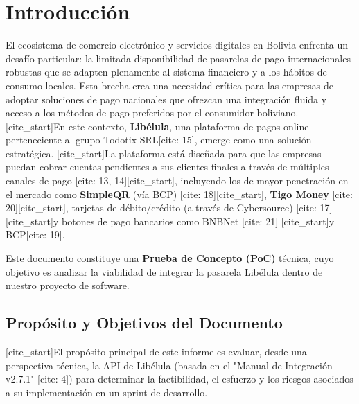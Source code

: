 \section{Introducción}
    El ecosistema de comercio electrónico y servicios digitales en Bolivia enfrenta un desafío particular: la limitada disponibilidad 
    de pasarelas de pago internacionales robustas que se adapten plenamente al sistema financiero y a los hábitos de consumo locales. 
    Esta brecha crea una necesidad crítica para las empresas de adoptar soluciones de pago nacionales que ofrezcan una integración 
    fluida y acceso a los métodos de pago preferidos por el consumidor boliviano.[cite_start]En este contexto, \textbf{Libélula}, 
    una plataforma de pagos online perteneciente al grupo Todotix SRL[cite: 15], emerge como una solución estratégica. [cite_start]La 
    plataforma está diseñada para que las empresas puedan cobrar cuentas pendientes a sus clientes finales a través de múltiples 
    canales de pago [cite: 13, 14][cite_start], incluyendo los de mayor penetración en el mercado como \textbf{SimpleQR} (vía BCP) 
    [cite: 18][cite_start], \textbf{Tigo Money} [cite: 20][cite_start], tarjetas de débito/crédito (a través de Cybersource) 
    [cite: 17] [cite_start]y botones de pago bancarios como BNBNet [cite: 21] [cite_start]y BCP[cite: 19].\par

    Este documento constituye una \textbf{Prueba de Concepto (PoC)} técnica, cuyo objetivo es analizar la viabilidad de integrar la 
    pasarela Libélula dentro de nuestro proyecto de software.\par

    \subsection{Propósito y Objetivos del Documento}
        [cite_start]El propósito principal de este informe es evaluar, desde una perspectiva técnica, la API de Libélula (basada 
        en el "Manual de Integración v2.7.1" [cite: 4]) para determinar la factibilidad, el esfuerzo y los riesgos asociados a su 
        implementación en un sprint de desarrollo.\par

